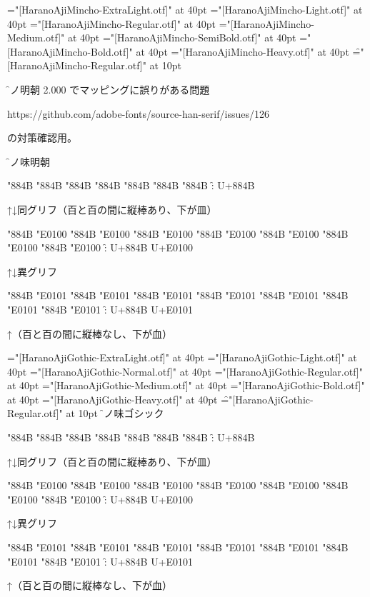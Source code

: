 
\nopagenumbers

%

\def\testa{%
\fonta\char"884B
\fontb\char"884B
\fontc\char"884B
\fontd\char"884B
\fonte\char"884B
\fontf\char"884B
\fontg\char"884B
\f : U+884B\par
↑↓同グリフ（百と百の間に縦棒あり、下が皿）\par
\fonta\char"884B \char"E0100
\fontb\char"884B \char"E0100
\fontc\char"884B \char"E0100
\fontd\char"884B \char"E0100
\fonte\char"884B \char"E0100
\fontf\char"884B \char"E0100
\fontg\char"884B \char"E0100
\f : U+884B U+E0100\par
↑↓異グリフ\par
\fonta\char"884B \char"E0101
\fontb\char"884B \char"E0101
\fontc\char"884B \char"E0101
\fontd\char"884B \char"E0101
\fonte\char"884B \char"E0101
\fontf\char"884B \char"E0101
\fontg\char"884B \char"E0101
\f : U+884B U+E0101\par
↑（百と百の間に縦棒なし、下が血）\par}

\font\fonta="[HaranoAjiMincho-ExtraLight.otf]" at 40pt
\font\fontb="[HaranoAjiMincho-Light.otf]" at 40pt
\font\fontc="[HaranoAjiMincho-Regular.otf]" at 40pt
\font\fontd="[HaranoAjiMincho-Medium.otf]" at 40pt
\font\fonte="[HaranoAjiMincho-SemiBold.otf]" at 40pt
\font\fontf="[HaranoAjiMincho-Bold.otf]" at 40pt
\font\fontg="[HaranoAjiMincho-Heavy.otf]" at 40pt
\font\f="[HaranoAjiMincho-Regular.otf]" at 10pt

\f
源ノ明朝 2.000 でマッピングに誤りがある問題\par
https://github.com/adobe-fonts/source-han-serif/issues/126\par
の対策確認用。\par

\vfill

\f 原ノ味明朝\par
\testa

\vfill

\font\fonta="[HaranoAjiGothic-ExtraLight.otf]" at 40pt
\font\fontb="[HaranoAjiGothic-Light.otf]" at 40pt
\font\fontc="[HaranoAjiGothic-Normal.otf]" at 40pt
\font\fontd="[HaranoAjiGothic-Regular.otf]" at 40pt
\font\fonte="[HaranoAjiGothic-Medium.otf]" at 40pt
\font\fontf="[HaranoAjiGothic-Bold.otf]" at 40pt
\font\fontg="[HaranoAjiGothic-Heavy.otf]" at 40pt
\font\f="[HaranoAjiGothic-Regular.otf]" at 10pt
\f 原ノ味ゴシック\par
\testa

